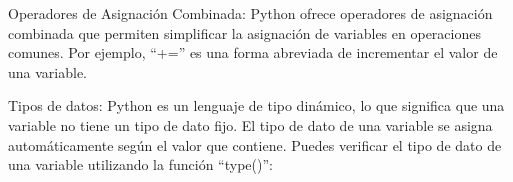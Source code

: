 Operadores de Asignación Combinada: Python ofrece operadores de asignación combinada que permiten simplificar la asignación de variables en operaciones comunes. Por ejemplo, ``+='' es una forma abreviada de incrementar el valor de una variable.\\

\begin{figure}[h]
    \centering
  \end{figure}

Tipos de datos: Python es un lenguaje de tipo dinámico, lo que significa que una variable no tiene un tipo de dato fijo. El tipo de dato de una variable se asigna automáticamente según el valor que contiene. Puedes verificar el tipo de dato de una variable utilizando la función ``type()'':\\

\begin{figure}[h]
    \centering
  \end{figure}


